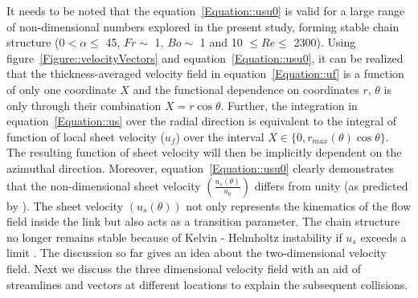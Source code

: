 It needs to be noted that the equation~\ref{Equation::usu0} is valid for a large range of non-dimensional numbers explored in the present study, forming stable chain structure (0\degree $< \alpha \le$  45\degree, $Fr \sim$ 1, $Bo \sim$ 1 and 10 $\le Re \le$ 2300).  Using figure~\ref{Figure::velocityVectors} and equation~\ref{Equation::usu0}, it can be realized that the thickness-averaged velocity field in equation~\ref{Equation::uf} is a function of only one coordinate $X$ and the functional dependence on coordinates $r$, $\theta$ is only through their combination $X = r\cos\theta$. Further, the integration in equation~\ref{Equation::us} over the radial direction is equivalent to the integral of function of local sheet velocity ($u_f$) over the interval $X \in \{0, r_{max}(\theta)\cos\theta\}$. The resulting function of sheet velocity will then be implicitly dependent on the azimuthal direction. Moreover, equation~\ref{Equation::usu0} clearly demonstrates that the non-dimensional sheet velocity $\left(\frac{u_s(\theta)}{u_0}\right)$ differs from unity (as predicted by \cite{choo2002velocity}). The sheet velocity $\left(u_s(\theta)\right)$ not only represents the kinematics of the flow field inside the link but also acts as a transition parameter. The chain structure no longer remains stable because of Kelvin - Helmholtz instability if $u_s$ exceeds a limit \citep{villermaux2002life}. The discussion so far gives an idea about the two-dimensional velocity field. Next we discuss the three dimensional velocity field with an aid of streamlines and vectors at different locations to explain the subsequent collisions.
